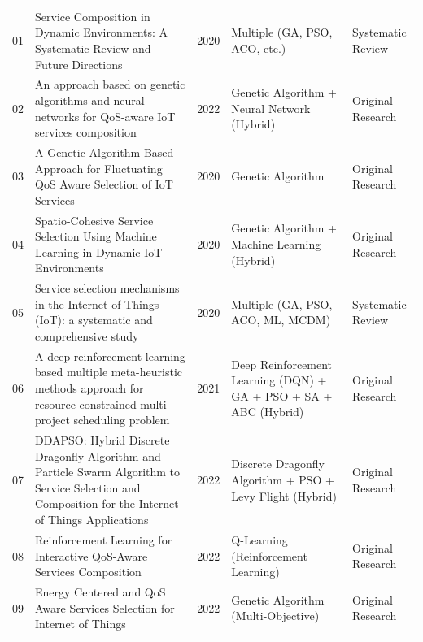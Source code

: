 \documentclass[12pt]{article}
\begin{document}
\begin{longtable}{|p{0.5cm}|p{4.5cm}|p{1cm}|p{3cm}|p{2cm}|}
	01          & Service Composition in Dynamic Environments: A Systematic Review and Future Directions                                                                & 2020          & Multiple (GA, PSO, ACO, etc.)                                    & Systematic Review   \\
	02          & An approach based on genetic algorithms and neural networks for QoS-aware IoT services composition                                                    & 2022          & Genetic Algorithm + Neural Network (Hybrid)                      & Original Research   \\
	03          & A Genetic Algorithm Based Approach for Fluctuating QoS Aware Selection of IoT Services                                                                & 2020          & Genetic Algorithm                                                & Original Research   \\
	04          & Spatio-Cohesive Service Selection Using Machine Learning in Dynamic IoT Environments                                                                  & 2020          & Genetic Algorithm + Machine Learning (Hybrid)                    & Original Research   \\
	05          & Service selection mechanisms in the Internet of Things (IoT): a systematic and comprehensive study                                                    & 2020          & Multiple (GA, PSO, ACO, ML, MCDM)                                & Systematic Review   \\
	06          & A deep reinforcement learning based multiple meta-heuristic methods approach for resource constrained multi-project scheduling problem                & 2021          & Deep Reinforcement Learning (DQN) + GA + PSO + SA + ABC (Hybrid) & Original Research   \\
	07          & DDAPSO: Hybrid Discrete Dragonfly Algorithm and Particle Swarm Algorithm to Service Selection and Composition for the Internet of Things Applications & 2022          & Discrete Dragonfly Algorithm + PSO + Levy Flight (Hybrid)        & Original Research   \\
	08          & Reinforcement Learning for Interactive QoS-Aware Services Composition                                                                                 & 2022          & Q-Learning (Reinforcement Learning)                              & Original Research   \\
	09          & Energy Centered and QoS Aware Services Selection for Internet of Things                                                                               & 2022          & Genetic Algorithm (Multi-Objective)                              & Original Research   \\

\end{longtable}
\end{document}
